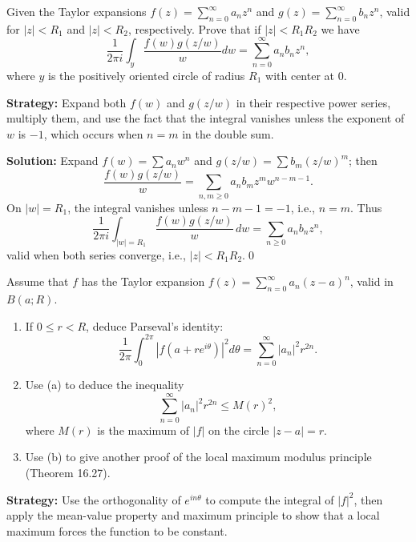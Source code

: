 \begin{problembox}
\begin{problemstatement}
Given the Taylor expansions \( f(z) = \sum_{n=0}^{\infty} a_n z^n \) and \( g(z) = \sum_{n=0}^{\infty} b_n z^n \), valid for \( |z| < R_1 \) and \( |z| < R_2 \), respectively. Prove that if \( |z| < R_1 R_2 \) we have
\[ \frac{1}{2\pi i} \int_y \frac{f(w) g(z/w)}{w} dw = \sum_{n=0}^{\infty} a_n b_n z^n, \]
where \( y \) is the positively oriented circle of radius \( R_1 \) with center at 0.
\end{problemstatement}
\end{problembox}

\noindent\textbf{Strategy:} Expand both \( f(w) \) and \( g(z/w) \) in their respective power series, multiply them, and use the fact that the integral vanishes unless the exponent of \( w \) is \(-1\), which occurs when \( n = m \) in the double sum.

\bigskip\noindent\textbf{Solution:}
Expand $f(w)=\sum a_n w^n$ and $g(z/w)=\sum b_m (z/w)^m$; then
\[\frac{f(w)g(z/w)}{w}=\sum_{n,m\ge0} a_n b_m z^m w^{n-m-1}.\]
On $|w|=R_1$, the integral vanishes unless $n-m-1=-1$, i.e., $n=m$. Thus
\[\frac{1}{2\pi i}\int_{|w|=R_1}\frac{f(w)g(z/w)}{w}\,dw=\sum_{n\ge0} a_n b_n z^n,\]
valid when both series converge, i.e., $|z|<R_1R_2$.\qed


\begin{problembox}
\begin{problemstatement}
Assume that \( f \) has the Taylor expansion \( f(z) = \sum_{n=0}^{\infty} a_n (z - a)^n \), valid in \( B(a; R) \).
\begin{enumerate}[label=(\alph*)]
\item If \( 0 \leq r < R \), deduce Parseval's identity:
\[ \frac{1}{2\pi} \int_0^{2\pi} |f(a + r e^{i\theta})|^2 d\theta = \sum_{n=0}^{\infty} |a_n|^2 r^{2n}. \]
\item Use (a) to deduce the inequality
\[ \sum_{n=0}^{\infty} |a_n|^2 r^{2n} \leq M(r)^2, \]
where \( M(r) \) is the maximum of \( |f| \) on the circle \( |z - a| = r \).
\item Use (b) to give another proof of the local maximum modulus principle (Theorem 16.27).
\end{enumerate}
\end{problemstatement}
\end{problembox}

\noindent\textbf{Strategy:} Use the orthogonality of \( e^{in\theta} \) to compute the integral of \( |f|^2 \), then apply the mean-value property and maximum principle to show that a local maximum forces the function to be constant.

